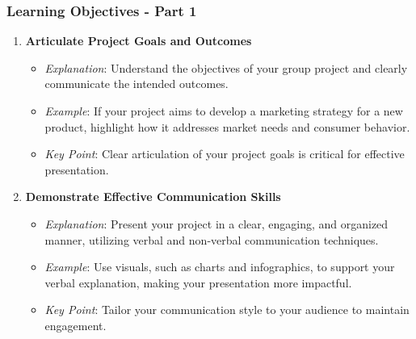 \documentclass[aspectratio=169]{beamer}
\begin{document}
\begin{frame}[fragile]
    \frametitle{Learning Objectives - Part 1}
    \begin{enumerate}
        \item \textbf{Articulate Project Goals and Outcomes}
            \begin{itemize}
                \item \textit{Explanation}: Understand the objectives of your group project and clearly communicate the intended outcomes.
                \item \textit{Example}: If your project aims to develop a marketing strategy for a new product, highlight how it addresses market needs and consumer behavior.
                \item \textit{Key Point}: Clear articulation of your project goals is critical for effective presentation.
            \end{itemize}

        \item \textbf{Demonstrate Effective Communication Skills}
            \begin{itemize}
                \item \textit{Explanation}: Present your project in a clear, engaging, and organized manner, utilizing verbal and non-verbal communication techniques.
                \item \textit{Example}: Use visuals, such as charts and infographics, to support your verbal explanation, making your presentation more impactful.
                \item \textit{Key Point}: Tailor your communication style to your audience to maintain engagement.
            \end{itemize}
    \end{enumerate}
\end{frame}
\end{document}
